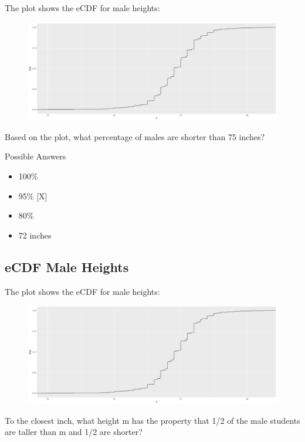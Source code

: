 \documentclass[]{article}
\providecommand{\tightlist}{%
  \setlength{\itemsep}{0pt}\setlength{\parskip}{0pt}}
\begin{document}
The plot shows the eCDF for male heights:

\begin{figure}
\centering
\includegraphics{img2.png}
\caption{}
\end{figure}

Based on the plot, what percentage of males are shorter than 75 inches?

Possible Answers

\begin{itemize}
\tightlist
\item
  100\%
\item
  95\% {[}X{]}
\item
  80\%
\item
  72 inches
\end{itemize}

\subsection{\texorpdfstring{\textbf{eCDF Male
Heights}}{eCDF Male Heights}}\label{ecdf-male-heights}

The plot shows the eCDF for male heights:

\begin{figure}
\centering
\includegraphics{img2.png}
\caption{}
\end{figure}

To the closest inch, what height m has the property that 1/2 of the male
students are taller than m and 1/2 are shorter?
\end{document}

